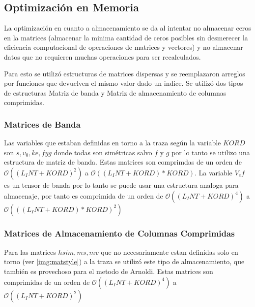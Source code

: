 \documentclass[a4paper,openright,12pt, oneside]{book}
\DeclareRobustCommand{\orderof}{\ensuremath{\mathcal{O}}}
\begin{document}
\subsection{Optimizaci\'on en Memoria}

La optimizaci\'on en cuanto a almacenamiento se da al intentar no almacenar ceros en la matrices (almacenar la minima cantidad de ceros posibles sin desmerecer la eficiencia computacional de operaciones de matrices y vectores) y no almacenar datos que no requieren muchas operaciones para ser recalculados.

Para esto se utiliz\'o estructuras de matrices dispersas y se reemplazaron arreglos por funciones que devuelven el mismo valor dado un indice. Se utiliz\'o dos tipos de estructuras Matriz de banda y Matriz de almacenamiento de columnas comprimidas.

\subsubsection{Matrices de Banda}
Las variables que estaban definidas en torno a la traza seg\'un la variable $KORD$ son $s, v_0, ke, f y
 g$ donde todas son sim\'etricas salvo $f$ y $g$ por lo tanto se utilizo una estructura de matriz de 
 banda. Estas matrices son comprimdas de un orden de $\orderof{((L_INT + KORD)^2)}$ a $\orderof{((L_INT+
  KORD) * KORD)}$. La variable $V_ef$ es un tensor de banda por lo tanto se puede usar una estructura 
 analoga para almacenaje, por tanto es comprimida de un orden de $\orderof{((L_INT + KORD)^4)}$ a $\orderof{(( (L_INT + KORD) * KORD)^2)}$


\subsubsection{Matrices de Almacenamiento de Columnas Comprimidas}
Para las matrices $hsim, ms, mv$ que no necesariamente estan definidas solo en torno (ver \ref{img:matstyle}) a la traza se utiliz\'o este tipo de almacenamiento, que tambi\'en es provechoso para el metodo de Arnoldi. Estas matrices son comprimidas de un orden de $\orderof{(( L_INT + KORD)^4)}$ a $\orderof{(( L_INT + KORD)^2)}$
\end{document}
